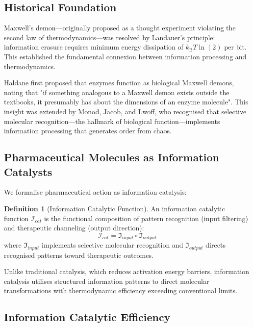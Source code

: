 \documentclass{article}
\newcommand{\kB}{k_\mathrm{B}}
\theoremstyle{definition}
\newtheorem{definition}[theorem]{Definition}
\theoremstyle{remark}
\begin{document}
\subsection{Historical Foundation}

Maxwell's demon—originally proposed as a thought experiment violating the second law of thermodynamics\cite{Maxwell1867}—was resolved by Landauer's principle: information erasure requires minimum energy dissipation of $\kB T \ln(2)$ per bit\cite{Landauer1961}. This established the fundamental connexion between information processing and thermodynamics.

Haldane first proposed that enzymes function as biological Maxwell demons, noting that "if something analogous to a Maxwell demon exists outside the textbooks, it presumably has about the dimensions of an enzyme molecule"\cite{Haldane1930}. This insight was extended by Monod, Jacob, and Lwoff, who recognised that selective molecular recognition—the hallmark of biological function—implements information processing that generates order from chaos\cite{Monod1972,Jacob1973}.

\subsection{Pharmaceutical Molecules as Information Catalysts}

We formalise pharmaceutical action as information catalysis:

\begin{definition}[Information Catalytic Function]
An information catalytic function $\mathcal{I}_{cat}$ is the functional composition of pattern recognition (input filtering) and therapeutic channeling (output direction):
\begin{equation}
\mathcal{I}_{cat} = \mathfrak{I}_{input} \circ \mathfrak{I}_{output}
\label{eq:info_catalysis}
\end{equation}
where $\mathfrak{I}_{input}$ implements selective molecular recognition and $\mathfrak{I}_{output}$ directs recognised patterns toward therapeutic outcomes.
\end{definition}

Unlike traditional catalysis, which reduces activation energy barriers, information catalysis utilises structured information patterns to direct molecular transformations with thermodynamic efficiency exceeding conventional limits.

\subsection{Information Catalytic Efficiency}
\end{document}
